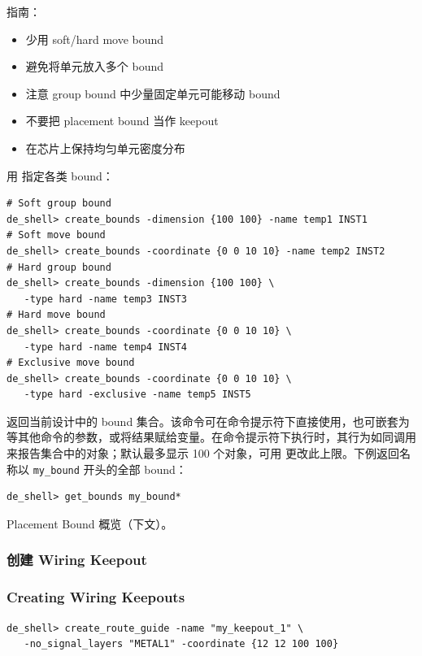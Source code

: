 指南：
\begin{itemize}
  \item 少用 soft/hard move bound
  \item 避免将单元放入多个 bound
  \item 注意 group bound 中少量固定单元可能移动 bound
  \item 不要把 placement bound 当作 keepout
  \item 在芯片上保持均匀单元密度分布
\end{itemize}

用  指定各类 bound：
\begin{lstlisting}
# Soft group bound
de_shell> create_bounds -dimension {100 100} -name temp1 INST1
# Soft move bound
de_shell> create_bounds -coordinate {0 0 10 10} -name temp2 INST2
# Hard group bound
de_shell> create_bounds -dimension {100 100} \
   -type hard -name temp3 INST3
# Hard move bound
de_shell> create_bounds -coordinate {0 0 10 10} \
   -type hard -name temp4 INST4
# Exclusive move bound
de_shell> create_bounds -coordinate {0 0 10 10} \
   -type hard -exclusive -name temp5 INST5
\end{lstlisting}

 返回当前设计中的 bound 集合。该命令可在命令提示符下直接使用，也可嵌套为  等其他命令的参数，或将结果赋给变量。在命令提示符下执行时，其行为如同调用  来报告集合中的对象；默认最多显示 100 个对象，可用  更改此上限。下例返回名称以 \texttt{my\_bound} 开头的全部 bound：
\begin{lstlisting}
de_shell> get_bounds my_bound*
\end{lstlisting}

\begin{seeAlsoBox}
Placement Bound 概览（下文）。
\end{seeAlsoBox}

\subsubsection{创建 Wiring Keepout}
\subsubsection*{Creating Wiring Keepouts}

\begin{lstlisting}
de_shell> create_route_guide -name "my_keepout_1" \
   -no_signal_layers "METAL1" -coordinate {12 12 100 100}
\end{lstlisting}

